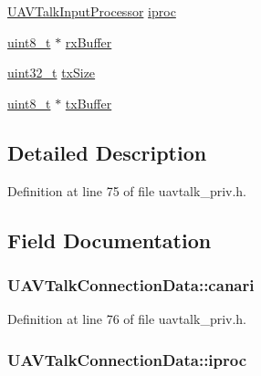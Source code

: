 \begin{DoxyCompactItemize}
\item 
\hyperlink{struct_u_a_v_talk_input_processor}{U\-A\-V\-Talk\-Input\-Processor} \hyperlink{struct_u_a_v_talk_connection_data_aa032a7b051df7fcc53accec1d7ba602b}{iproc}
\item 
\hyperlink{stdint_8h_aba7bc1797add20fe3efdf37ced1182c5}{uint8\-\_\-t} $\ast$ \hyperlink{struct_u_a_v_talk_connection_data_a183fa5adb153369530ac1ff53c4f3f8f}{rx\-Buffer}
\item 
\hyperlink{stdint_8h_a435d1572bf3f880d55459d9805097f62}{uint32\-\_\-t} \hyperlink{struct_u_a_v_talk_connection_data_a1cac6d157b4dbf6d91882833c7ce304c}{tx\-Size}
\item 
\hyperlink{stdint_8h_aba7bc1797add20fe3efdf37ced1182c5}{uint8\-\_\-t} $\ast$ \hyperlink{struct_u_a_v_talk_connection_data_a63bb147699417c91ed5176745eb46211}{tx\-Buffer}
\end{DoxyCompactItemize}


\subsection{Detailed Description}


Definition at line 75 of file uavtalk\-\_\-priv.\-h.



\subsection{Field Documentation}
\hypertarget{struct_u_a_v_talk_connection_data_a7fcfd5eef5b464048953ae8a62995142}{
\subsubsection[{canari}]{ U\-A\-V\-Talk\-Connection\-Data\-::canari}}\label{struct_u_a_v_talk_connection_data_a7fcfd5eef5b464048953ae8a62995142}


Definition at line 76 of file uavtalk\-\_\-priv.\-h.

\hypertarget{struct_u_a_v_talk_connection_data_aa032a7b051df7fcc53accec1d7ba602b}{
\subsubsection[{iproc}]{ U\-A\-V\-Talk\-Connection\-Data\-::iproc}}\label{struct_u_a_v_talk_connection_data_aa032a7b051df7fcc53accec1d7ba602b}


